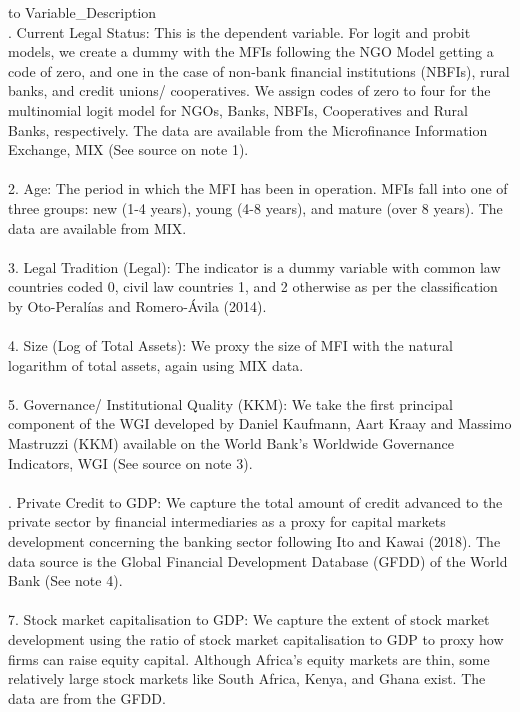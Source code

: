 \documentclass[a4paper, nobind]{templates/ociamthesis}
\begin{document}
\begin{table}

\caption{\label{tab:unnamed-chunk-141}Description of Variables}
\centering
\begin{tabu} to 
\toprule
Variable\_Description\\
. Current Legal Status: This is the dependent variable. For logit and probit models, we create a dummy with the MFIs following the NGO Model getting a code of zero, and one in the case of non-bank financial institutions (NBFIs), rural banks, and credit unions/ cooperatives. We assign codes of zero to four for the multinomial logit model for NGOs, Banks, NBFIs, Cooperatives and Rural Banks, respectively. The data are available from the Microfinance Information Exchange, MIX (See source on note 1).\\
\\
2.  Age: The period in which the MFI has been in operation. MFIs fall into one of three groups: new (1-4 years), young (4-8 years), and mature (over 8 years). The data are available from MIX.\\
\\
3. Legal Tradition (Legal): The indicator is a dummy variable with common law countries coded 0, civil law countries 1, and 2 otherwise as per the classification by Oto-Peralías and Romero-Ávila (2014).\\
\addlinespace
\\
4. Size (Log of Total Assets): We proxy the size of MFI with the natural logarithm of total assets, again using MIX data.\\
\\
5. Governance/ Institutional Quality (KKM): We take the first principal component of the WGI developed by Daniel Kaufmann, Aart Kraay and Massimo Mastruzzi (KKM) available on the World Bank's Worldwide Governance Indicators, WGI (See source on note 3).\\
\\
. Private Credit to GDP: We capture the total amount of credit advanced to the private sector by financial intermediaries as a proxy for capital markets development concerning the banking sector following Ito and Kawai (2018). The data source is the Global Financial Development Database (GFDD) of the World Bank (See note 4).\\
\\
7. Stock market capitalisation to GDP: We capture the  extent of stock market development using the ratio of stock market capitalisation to GDP to proxy how firms can raise equity capital. Although Africa's equity markets are thin, some relatively large stock markets like South Africa, Kenya, and Ghana exist. The data are from the GFDD.\\

\end{tabu}
\end{table}
\end{document}
